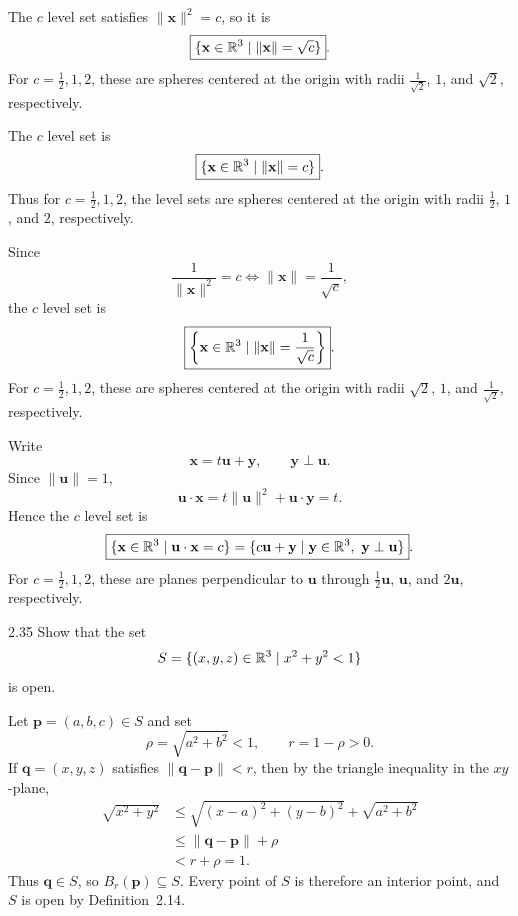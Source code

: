 \documentclass[11pt,oneside]{article}
\begin{document}
\begin{solution}
\begin{problemsubparts}
    \item The $c$ level set satisfies $\|\mathbf x\|^2=c$, so it is
    \[
        \boxed{\{\mathbf x\in\mathbb{R}^3\mid\|\mathbf x\|=\sqrt c\}}.
    \]
    For $c=\frac12,1,2$, these are spheres centered at the origin with radii $\frac{1}{\sqrt2}$, $1$, and $\sqrt2$, respectively.

    \item The $c$ level set is
    \[
        \boxed{\{\mathbf x\in\mathbb{R}^3\mid\|\mathbf x\|=c\}}.
    \]
    Thus for $c=\frac12,1,2$, the level sets are spheres centered at the origin with radii $\frac12$, $1$, and $2$, respectively.

    \item Since
    \[
        \frac{1}{\|\mathbf x\|^2}=c
        \iff
        \|\mathbf x\|=\frac{1}{\sqrt c},
    \]
    the $c$ level set is
    \[
        \boxed{\left\{\mathbf x\in\mathbb{R}^3\mid\|\mathbf x\|=\frac{1}{\sqrt c}\right\}}.
    \]
    For $c=\frac12,1,2$, these are spheres centered at the origin with radii $\sqrt2$, $1$, and $\frac{1}{\sqrt2}$, respectively.

    \item Write
    \[
        \mathbf x=t\mathbf u+\mathbf y,
        \qquad
        \mathbf y\perp\mathbf u.
    \]
    Since $\|\mathbf u\|=1$,
    \[
        \mathbf u\cdot\mathbf x
        =t\|\mathbf u\|^2+\mathbf u\cdot\mathbf y
        =t.
    \]
    Hence the $c$ level set is
    \[
        \boxed{\{\mathbf x\in\mathbb{R}^3\mid\mathbf u\cdot\mathbf x=c\}
        =\{c\mathbf u+\mathbf y\mid\mathbf y\in\mathbb{R}^3,~\mathbf y\perp\mathbf u\}}.
    \]
    For $c=\frac12,1,2$, these are planes perpendicular to $\mathbf u$ through $\frac12\mathbf u$, $\mathbf u$, and $2\mathbf u$, respectively.
\end{problemsubparts}
\end{solution}

\begin{problem}{2.35}
Show that the set
\[
    S=\{(x,y,z)\in\mathbb{R}^3\mid x^2+y^2<1\}
\]
is open.
\end{problem}

\begin{solution}
Let $\mathbf p=(a,b,c)\in S$ and set
\[
    \rho=\sqrt{a^2+b^2}<1,
    \qquad
    r=1-\rho>0.
\]
If $\mathbf q=(x,y,z)$ satisfies $\|\mathbf q-\mathbf p\|<r$, then by the triangle inequality in the $xy$-plane,
\begin{align*}
    \sqrt{x^2+y^2}
    &\leq \sqrt{(x-a)^2+(y-b)^2}+\sqrt{a^2+b^2}\\
    &\leq \|\mathbf q-\mathbf p\|+\rho\\
    &<r+\rho=1.
\end{align*}
Thus $\mathbf q\in S$, so $B_r(\mathbf p)\subseteq S$. Every point of $S$ is therefore an interior point, and $S$ is open by Definition~2.14.
\end{solution}
\end{document}

